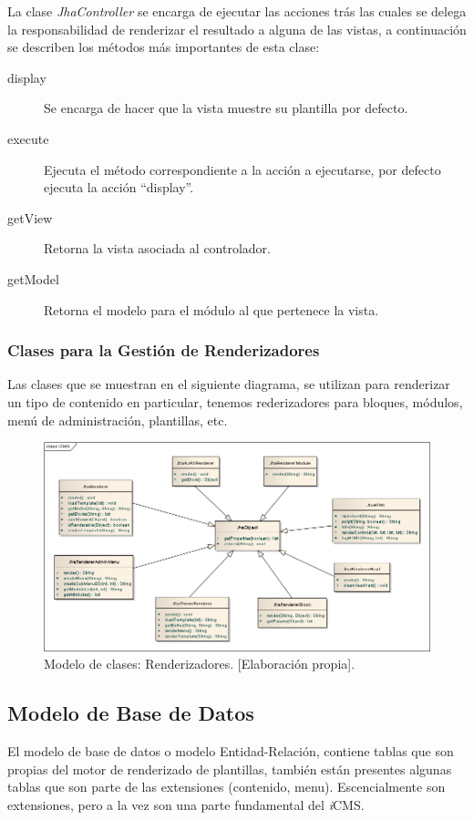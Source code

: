 

La clase \emph{JhaController} se encarga de ejecutar las acciones tr\'as las cuales se delega la responsabilidad de renderizar el resultado a alguna de las vistas, a continuaci\'on se describen los m\'etodos m\'as importantes de esta clase:
\begin{description}
\item[display] Se encarga de hacer que la vista muestre su plantilla por defecto.
\item[execute] Ejecuta el m\'etodo correspondiente a la acci\'on a ejecutarse, por defecto ejecuta la acci\'on ``display''.
\item[getView] Retorna la vista asociada al controlador.
\item[getModel] Retorna el modelo para el m\'odulo al que pertenece la vista.
\end{description}



\newpage
\subsubsection{Clases para la Gesti\'on de Renderizadores}
Las clases que se muestran en el siguiente diagrama, se utilizan para renderizar un tipo de contenido en particular, tenemos rederizadores para bloques, m\'odulos, men\'u de administraci\'on, plantillas, etc.\\

\begin{figure}[h]
\centering
\includegraphics[scale=.38, keepaspectratio=true]{imagenes/10_imagen.png}
\caption{Modelo de clases: Renderizadores. [Elaboraci\'on propia].}
\end{figure}

\subsection{Modelo de Base de Datos}
El modelo de base de datos o modelo Entidad-Relaci\'on, contiene tablas que son propias del motor de renderizado de plantillas, tambi\'en est\'an presentes algunas tablas que son parte de las extensiones (contenido, menu). Escencialmente son extensiones, pero a la vez son una parte fundamental del \textit{i}CMS.

